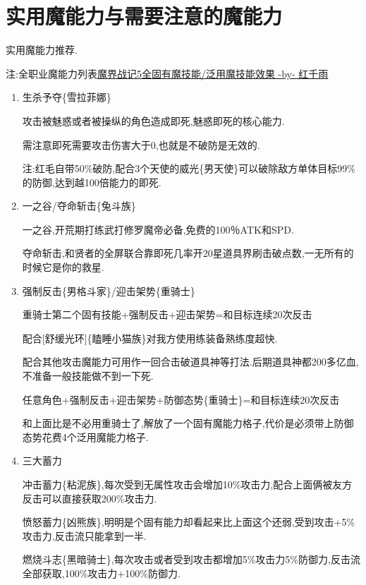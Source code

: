 \newpage

\section{实用魔能力与需要注意的魔能力}

	实用魔能力推荐.

	注:全职业魔能力列表\href{http://tieba.baidu.com/p/3765501530}{魔界战记5全固有魔技能/泛用魔技能效果 -by- 红千雨}

	\begin{enumerate}

		\item
		生杀予夺\{雪拉菲娜\}

		攻击被魅惑或者被操纵的角色造成即死,魅惑即死的核心能力.

		需注意即死需要攻击伤害大于0,也就是不破防是无效的.

		注:红毛自带50\%破防,配合3个天使的威光\{男天使\}可以破除敌方单体目标99\%的防御,达到越100倍能力的即死.

		\item
		一之谷/夺命斩击\{兔斗族\}

		一之谷,开荒期打练武打修罗魔帝必备,免费的100％ATK和SPD.

		夺命斩击,和贤者的全屏联合靠即死几率开20星道具界刷击破点数,一无所有的时候它是你的救星.

		\item
		强制反击\{男格斗家\}/迎击架势\{重骑士\}

		重骑士第二个固有技能+强制反击+迎击架势=和目标连续20次反击

		配合[舒缓光环]\{瞌睡小猫族\}对我方使用练装备熟练度超快.

		配合其他攻击魔能力可用作一回合击破道具神等打法.后期道具神都200多亿血,不准备一般技能做不到一下死.

		任意角色+强制反击+迎击架势+防御态势\{重骑士\}=和目标连续20次反击

		和上面比是不必用重骑士了,解放了一个固有魔能力格子,代价是必须带上防御态势花费4个泛用魔能力格子.
		
		\item
		三大蓄力

		冲击蓄力\{粘泥族\},每次受到无属性攻击会增加10\%攻击力,配合上面俩被友方反击可以直接获取200\%攻击力.

		愤怒蓄力\{凶熊族\},明明是个固有能力却看起来比上面这个还弱,受到攻击+5\%攻击力,反击流只能拿到一半.

		燃烧斗志\{黑暗骑士\},每次攻击或者受到攻击都增加5\%攻击力5\%防御力,反击流全部获取,100\%攻击力+100\%防御力.


\end{enumerate}

